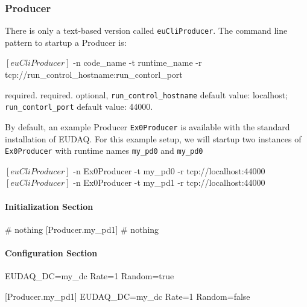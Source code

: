 \subsubsection{Producer}
\label{sec:testproducer}
There is only a text-based version called \texttt{euCliProducer}.
The command line pattern to startup a Producer is:
\begin{listing}[mybash]
$[euCliProducer]$ -n {code_name} -t {runtime_name} -r tcp://{run_control_hostname}:{run_contorl_port}
\end{listing}

\begin{description}
required.
required.
optional, \texttt{run\_control\_hostname} default value: localhost;  \texttt{run\_contorl\_port}  default value: 44000.
\end{description}

By default, an example Producer \texttt{Ex0Producer} is available with the standard installation of EUDAQ.
For this example setup, we will startup two instances of \texttt{Ex0Producer} with runtime names \texttt{my\_pd0} and \texttt{my\_pd0}\\
\begin{listing}[mybash]
$[euCliProducer]$ -n Ex0Producer -t my_pd0 -r tcp://localhost:44000
$[euCliProducer]$ -n Ex0Producer -t my_pd1 -r tcp://localhost:44000
\end{listing}

\paragraph{Initialization Section}
\begin{listing}[conf]
[Producer.my_pd0]
# nothing
[Producer.my_pd1]
# nothing
\end{listing}

\paragraph{Configuration Section}
\begin{listing}[conf]
[Producer.my_pd0]
EUDAQ_DC=my_dc
Rate=1
Random=true

[Producer.my_pd1]
EUDAQ_DC=my_dc
Rate=1
Random=false
\end{listing}

